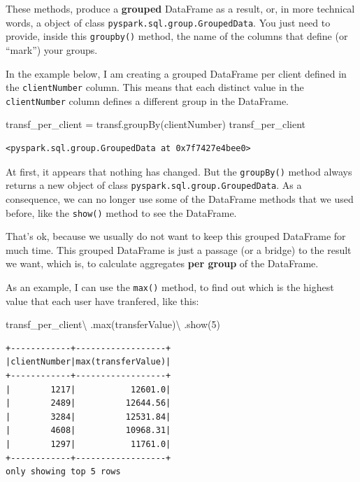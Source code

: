 \documentclass[
  11pt,
  letterpaper,
  DIV=11,
  numbers=noendperiod]{scrreprt}
\newenvironment{Shaded}{\begin{snugshade}}{\end{snugshade}}
\newcommand{\BuiltInTok}[1]{\textcolor[rgb]{0.00,0.23,0.31}{#1}}
\newcommand{\DecValTok}[1]{\textcolor[rgb]{0.68,0.00,0.00}{#1}}
\newcommand{\NormalTok}[1]{\textcolor[rgb]{0.00,0.23,0.31}{#1}}
\newcommand{\OperatorTok}[1]{\textcolor[rgb]{0.37,0.37,0.37}{#1}}
\newcommand{\StringTok}[1]{\textcolor[rgb]{0.13,0.47,0.30}{#1}}
\begin{document}
These methods, produce a \textbf{grouped} DataFrame as a result, or, in
more technical words, a object of class
\texttt{pyspark.sql.group.GroupedData}. You just need to provide, inside
this \texttt{groupby()} method, the name of the columns that define (or
``mark'') your groups.

In the example below, I am creating a grouped DataFrame per client
defined in the \texttt{clientNumber} column. This means that each
distinct value in the \texttt{clientNumber} column defines a different
group in the DataFrame.

\begin{Shaded}
\begin{Highlighting}[]
\NormalTok{transf\_per\_client }\OperatorTok{=}\NormalTok{ transf.groupBy(}\StringTok{\textquotesingle{}clientNumber\textquotesingle{}}\NormalTok{)}
\NormalTok{transf\_per\_client}
\end{Highlighting}
\end{Shaded}

\begin{verbatim}
<pyspark.sql.group.GroupedData at 0x7f7427e4bee0>
\end{verbatim}

At first, it appears that nothing has changed. But the
\texttt{groupBy()} method always returns a new object of class
\texttt{pyspark.sql.group.GroupedData}. As a consequence, we can no
longer use some of the DataFrame methods that we used before, like the
\texttt{show()} method to see the DataFrame.

That's ok, because we usually do not want to keep this grouped DataFrame
for much time. This grouped DataFrame is just a passage (or a bridge) to
the result we want, which is, to calculate aggregates \textbf{per group}
of the DataFrame.

As an example, I can use the \texttt{max()} method, to find out which is
the highest value that each user have tranfered, like this:

\begin{Shaded}
\begin{Highlighting}[]
\NormalTok{transf\_per\_client}\OperatorTok{\textbackslash{}}
\NormalTok{  .}\BuiltInTok{max}\NormalTok{(}\StringTok{\textquotesingle{}transferValue\textquotesingle{}}\NormalTok{)}\OperatorTok{\textbackslash{}}
\NormalTok{  .show(}\DecValTok{5}\NormalTok{)}
\end{Highlighting}
\end{Shaded}

\begin{verbatim}
+------------+------------------+
|clientNumber|max(transferValue)|
+------------+------------------+
|        1217|           12601.0|
|        2489|          12644.56|
|        3284|          12531.84|
|        4608|          10968.31|
|        1297|           11761.0|
+------------+------------------+
only showing top 5 rows
\end{verbatim}
\end{document}
